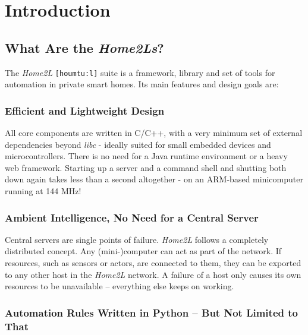 \documentclass[12pt,english,parskip=half,headheight=19pt]{scrreprt}
\begin{document}
\chapter{Introduction}
\label{ch:intro}
%
%



\section{What Are the \textit{Home2Ls}?}
\label{sec:intro-overview}


The \textit{Home2L} \texttt{[houmtu:l]} suite is a framework, library and set of tools
for automation in private smart homes. Its main features and design goals are:


\subsection*{Efficient and Lightweight Design}

All core components are written in C/C++, with a very minimum set of external
dependencies beyond \textit{libc} - ideally suited for small embedded devices and
microcontrollers. There is no need for a Java runtime environment or a heavy web
framework. Starting up a server and a command shell and shutting both down again
takes less than a second altogether - on an ARM-based minicomputer running
at 144 MHz!


\subsection*{Ambient Intelligence, No Need for a Central Server}

Central servers are single points of failure. \textit{Home2L} follows a completely
distributed concept. Any (mini-)computer can act as part of the network. If
resources, such as sensors or actors, are connected to them, they can be
exported to any other host in the \textit{Home2L} network. A failure of a host only
causes its own resources to be unavailable -- everything else keeps on working.


\subsection*{Automation Rules Written in Python -- But Not Limited to That}
\end{document}
